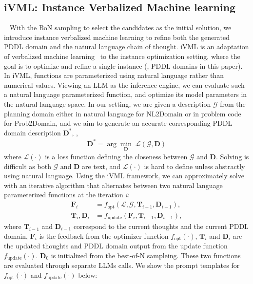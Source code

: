 \subsection{iVML: Instance Verbalized Machine learning} 
~\label{text:ivml}
With the BoN sampling to select the candidates as the initial solution, we introduce instance verbalized machine learning to refine both the generated PDDL domain and the natural language chain of thought. iVML is an adaptation of verbalized machine learning~\cite{xiao2024verbalized} to the instance optimization setting, where the goal is to optimize and refine a single instance (\ie, PDDL domains in this paper).
In iVML, functions are parameterized using natural language rather than numerical values.
Viewing an LLM as the inference engine, we can evaluate such a natural language parameterized function, and optimize its model parameters in the natural language space.
In our setting, we are given a description $\mathcal{G}$ from the planning domain either in natural language for NL2Domain or in problem code for Prob2Domain, and we aim to generate an accurate corresponding PDDL domain description $\mathbf{D}^*$, \ie,
\begin{align} \label{eq:loss}
    \mathbf{D}^* = \arg\min_\mathbf{D} \; \mathcal{L}(\mathcal{G}, \mathbf{D})
\end{align}
where $\mathcal{L}(\cdot)$ is a loss function defining the closeness between $\mathcal{G}$ and $\mathbf{D}$.
Solving  is difficult as both $\mathcal{G}$ and $\mathbf{D}$ are text, and $\mathcal{L}(\cdot)$ is hard to define unless abstractly using natural language.
Using the iVML framework, we can approximately solve  with an iterative algorithm that alternates between two natural language parameterized functions at the iteration $i$:
\begin{align}
    \mathbf{F}_{i} & = f_\mathrm{opt}(\mathcal{L}, \mathcal{G}, \mathbf{T}_{i-1}, \mathbf{D}_{i-1}), \\
    \mathbf{T}_{i}, \mathbf{D}_{i} & = f_\mathrm{update}(\mathbf{F}_{i}, \mathbf{T}_{i-1}, \mathbf{D}_{i-1}),
\end{align}
where $\mathbf{T}_{i-1}$ and $\mathbf{D}_{i-1}$ correspond to the current thoughts and the current PDDL domain, $\mathbf{F}_{i}$ is the feedback from the optimizer function $f_\mathrm{opt}(\cdot)$, $\mathbf{T}_{i}$ and $\mathbf{D}_{i}$ are the updated thoughts and PDDL domain output from the update function $f_\mathrm{update}(\cdot)$.
$\mathbf{D}_{0}$ is initialized from the best-of-N sampleing.
These two functions are evaluated through separate LLMs calls.
We show the prompt templates for $f_\mathrm{opt}(\cdot)$ and $f_\mathrm{update}(\cdot)$ below:

